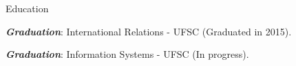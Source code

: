 \begin{rubric}
  {Education}
  {
    
    \entry* \emph{\textbf{Graduation}}: International Relations - UFSC
    (Graduated in 2015).

    \entry* \emph{\textbf{Graduation}}: Information Systems - UFSC (In progress).
  }
\end{rubric}
